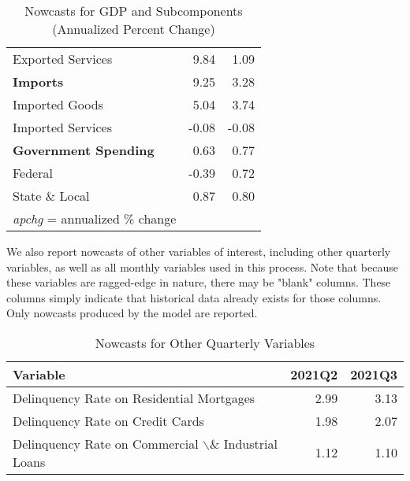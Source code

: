 \documentclass[11pt, letterpaper]{article}\usepackage[]{graphicx}\usepackage[]{color}
\begin{document}
\begin{table}[H]
\begin{tabular}{lrr}
  \hspace{8mm}  Exported Services & 9.84 & 1.09 \\ 
  \hspace{0mm} \textbf{Imports} & 9.25 & 3.28 \\ 
  \hspace{8mm}  Imported Goods & 5.04 & 3.74 \\ 
  \hspace{8mm}  Imported Services & -0.08 & -0.08 \\ 
  \hspace{0mm} \textbf{Government Spending} & 0.63 & 0.77 \\ 
  \hspace{8mm}  Federal & -0.39 & 0.72 \\ 
  \hspace{8mm}  State \& Local & 0.87 & 0.80 \\ 
   \hline 
 \textit{apchg} = annualized \% change 
\end{tabular}
\endgroup
\caption{Nowcasts for GDP and Subcomponents (Annualized Percent Change)} 
\end{table}


We also report nowcasts of other variables of interest, including other quarterly variables, as well as all monthly variables used in this process. Note that because these variables are ragged-edge in nature, there may be "blank" columns. These columns simply indicate that historical data already exists for those columns. Only nowcasts produced by the model are reported.
\begin{table}[H]
\centering
\begingroup\fontsize{11pt}{13pt}\selectfont
\begin{tabular}{lrr}
  \hline
Variable & 2021Q2 & 2021Q3 \\ 
  \hline
Delinquency Rate on Residential Mortgages & 2.99 & 3.13 \\ 
  Delinquency Rate on Credit Cards & 1.98 & 2.07 \\ 
  Delinquency Rate on Commercial $\backslash$\& Industrial Loans & 1.12 & 1.10 \\ 
   \hline
\end{tabular}
\endgroup
\caption{Nowcasts for Other Quarterly Variables} 
\end{table}
\end{document}
